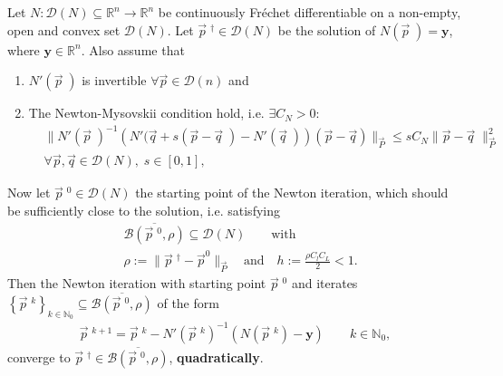  \begin{theorem}
     Let $N: \mathcal{D}(N) \subseteq \mathbb{R}^{n}\to \mathbb{R}^{n}$ be
     continuously Fr\'echet differentiable on a non-empty, open and convex
     set $\mathcal{D}\left( N \right) $. Let $\vec{p}\;^{\dagger} \in
     \mathcal{D}(N)$ be the solution of $N(\vec{p}\;) = \mathbf{y}$, where
     $\mathbf{y} \in \mathbb{R}^{n}$. Also assume that
     \begin{enumerate}
         \item $N'(\vec{p}\;)$ is invertible $\forall \vec{p} \in
             \mathcal{D}(n)$ and
         \item The Newton-Mysovskii condition hold, i.e. $\exists C_N > 0:$
            \begin{align}
                &\big\| N'(\vec{p}\;)^{-1}\left( N'(\vec{q} + s(\vec{p} -
                \vec{q}\;) - N'(\vec{q}\;)\right) (\vec{p} - \vec{q})
                \big\|_{\vec{P}}
                \leq s C_N \|\vec{p} - \vec{q} \;\|^{2}_{\vec{P}}\\
                & \forall \vec{p}, \vec{q} \in \mathcal{D}(N), \; s \in[0,
                1],
            \end{align}
     \end{enumerate}
     Now let $\vec{p}\;^{0} \in \mathcal{D}(N)$ the starting point of the
     Newton iteration, which should be sufficiently close to the solution,
     i.e. satisfying
     \begin{align}
         &\overline{\mathcal{B}\left(\vec{p}\;^{0}, \rho \right)}\subseteq
         \mathcal{D}(N) \qquad \text{with}\\
         &\rho := \|\vec{p}\;^{\dagger} - \vec{p}^{0}\|_{\vec{P}} \quad
         \text{and} \quad h:= \frac{\rho C_l C_L}{2} <1. \label{eq: locality}
     \end{align}
     Then the Newton iteration with starting point $\vec{p}\;^{0}$ and
     iterates $\left\{\vec{p}\;^{k}  \right\}_{k \in \mathbb{N}_0} \subseteq
     \overline{\mathcal{B}(\vec{p}\;^{0}, \rho)} $ of the
     form
     \begin{align}
         \vec{p}\;^{k+1} = \vec{p}\;^{k} - N'(\vec{p}\;^{k})^{-1}\left(
         N\left(\vec{p}\;^{k}  \right) - \mathbf{y} \right)  \qquad k \in
         \mathbb{N}_0,
     \end{align}
     converge to $\vec{p}\;^{\dagger} \in \overline{\mathcal{B}(\vec{p}\;^{0},
     \rho)}$, \textbf{quadratically}.
 \end{theorem}

